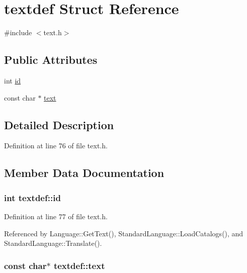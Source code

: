 \hypertarget{structtextdef}{}\section{textdef Struct Reference}
\label{structtextdef}


{\ttfamily \#include $<$text.\+h$>$}

\subsection*{Public Attributes}
\begin{DoxyCompactItemize}
\item 
int \hyperlink{structtextdef_a2e28e2dfda198136301df4c8cab970a6}{id}
\item 
const char $\ast$ \hyperlink{structtextdef_a24f4d3af836a1f3c840833df7e388b60}{text}
\end{DoxyCompactItemize}


\subsection{Detailed Description}


Definition at line 76 of file text.\+h.



\subsection{Member Data Documentation}
\subsubsection[{\texorpdfstring{id}{id}}]{\setlength{\rightskip}{0pt plus 5cm}int textdef\+::id}\hypertarget{structtextdef_a2e28e2dfda198136301df4c8cab970a6}{}\label{structtextdef_a2e28e2dfda198136301df4c8cab970a6}


Definition at line 77 of file text.\+h.



Referenced by Language\+::\+Get\+Text(), Standard\+Language\+::\+Load\+Catalogs(), and Standard\+Language\+::\+Translate().

\subsubsection[{\texorpdfstring{text}{text}}]{\setlength{\rightskip}{0pt plus 5cm}const char$\ast$ textdef\+::text}\hypertarget{structtextdef_a24f4d3af836a1f3c840833df7e388b60}{}\label{structtextdef_a24f4d3af836a1f3c840833df7e388b60}


